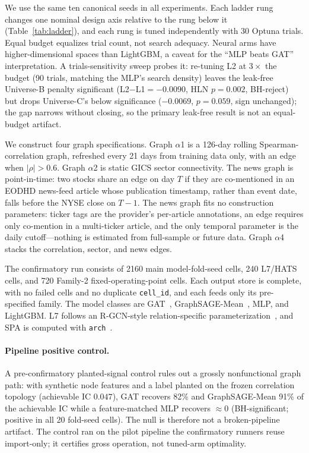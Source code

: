 \documentclass[sigconf,nonacm]{acmart}
\begin{document}
We use the same ten canonical seeds in all experiments. Each ladder rung changes one nominal design axis relative to the rung below it (Table~\ref{tab:ladder}), and each rung is tuned independently with 30 Optuna trials. Equal budget equalizes trial count, not search adequacy. Neural arms have higher-dimensional spaces than LightGBM, a caveat for the ``MLP beats GAT'' interpretation. A trials-sensitivity sweep probes it: re-tuning L2 at $3\times$ the budget (90 trials, matching the MLP's search density) leaves the leak-free Universe-B penalty significant (L2$-$L1${}=-0.0090$, HLN $p=0.002$, BH-reject) but drops Universe-C's below significance ($-0.0069$, $p=0.059$, sign unchanged); the gap narrows without closing, so the primary leak-free result is not an equal-budget artifact.

We construct four graph specifications. Graph $\alpha$1 is a 126-day rolling Spearman-correlation graph, refreshed every 21 days from training data only, with an edge when $|\rho|>0.6$. Graph $\alpha$2 is static GICS sector connectivity. The news graph is point-in-time: two stocks share an edge on day $T$ if they are co-mentioned in an EODHD news-feed article whose publication timestamp, rather than event date, falls before the NYSE close on $T-1$. The news graph fits no construction parameters: ticker tags are the provider's per-article annotations, an edge requires only co-mention in a multi-ticker article, and the only temporal parameter is the daily cutoff---nothing is estimated from full-sample or future data. Graph $\alpha$4 stacks the correlation, sector, and news edges.

The confirmatory run consists of 2160 main model-fold-seed cells, 240 L7/HATS cells, and 720 Family-2 fixed-operating-point cells. Each output store is complete, with no failed cells and no duplicate \texttt{cell\_id}, and each feeds only its pre-specified family. The model classes are GAT~\cite{velickovic2018gat}, GraphSAGE-Mean~\cite{hamilton2017graphsage}, MLP, and LightGBM. L7 follows an R-GCN-style relation-specific parameterization~\cite{schlichtkrull2018rgcn}, and SPA is computed with \texttt{arch}~\cite{sheppard_arch}.

\paragraph{Pipeline positive control.} A pre-confirmatory planted-signal control rules out a grossly nonfunctional graph path: with synthetic node features and a label planted on the frozen correlation topology (achievable IC $0.047$), GAT recovers 82\% and GraphSAGE-Mean 91\% of the achievable IC while a feature-matched MLP recovers ${\approx}0$ (BH-significant; positive in all 20 fold-seed cells). The null is therefore not a broken-pipeline artifact. The control ran on the pilot pipeline the confirmatory runners reuse import-only; it certifies gross operation, not tuned-arm optimality.
\end{document}
